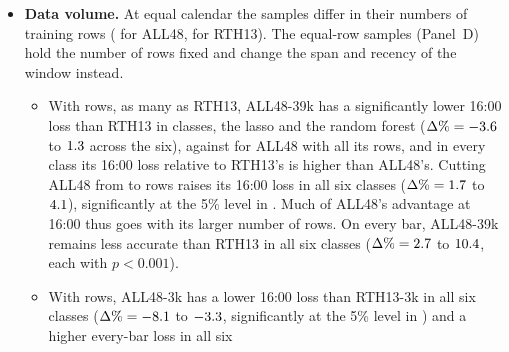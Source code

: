 \begin{itemize}
  \begin{itemize}
  \item The full-set forecasts trained on ALL48 have a higher every-bar QLIKE than those trained on RTH13 in all six
    classes ($\Delta\% = \rhtaAllVsRthBarPctMin$ to $\rhtaAllVsRthBarPctMax$), each significant at the 1\% level
    (the largest, \rhtaAllVsRthBarPMax).
  \item The full predictor set lowers the every-bar loss significantly in every class under both samples, and by more
    under RTH13 in all six: $\Delta\% = \rhtaLinPctRthBarMin$ to $\rhtaLinPctRthBarMax$ for the penalized linear models
    and $\rhtaTreePctRthBarMin$ to $\rhtaTreePctRthBarMax$ for the tree ensembles, against $\rhtaLinPctAllBarMin$ to
    $\rhtaLinPctAllBarMax$ and $\rhtaTreePctAllBarMin$ to $\rhtaTreePctAllBarMax$ under ALL48.
  \end{itemize}
\item \textbf{Data volume.} At equal calendar the samples differ in their numbers of training rows (\rhtaRowsAll{}
  for ALL48, \rhtaRowsRth{} for RTH13). The equal-row samples (Panel~D) hold the number of rows fixed and change the
  span and recency of the window instead.
  \begin{itemize}
  \item With \rhtaRowsLarge{} rows, as many as RTH13, ALL48-39k has a significantly lower 16:00 loss than RTH13 in
    \rhtaNAllThirtyNineKVsRthCloseSig{} classes, the lasso and the random forest
    ($\Delta\% = -3.6$ to $1.3$ across the six),
    against \rhtaNAllVsRthCloseSig{} for ALL48 with all its rows, and in every class its 16:00 loss relative to
    RTH13's is higher than ALL48's. Cutting ALL48 from \rhtaRowsAll{} to \rhtaRowsLarge{} rows raises its 16:00 loss
    in all six classes ($\Delta\% = 1.7$ to $4.1$),
    significantly at the 5\% level in \rhtaNAllThirtyNineKVsAllCloseSig. Much of ALL48's advantage at 16:00 thus
    goes with its larger number of rows. On every bar, ALL48-39k remains less accurate than RTH13 in all six classes
    ($\Delta\% = 2.7$ to $10.4$, each with $p < 0.001$).
  \item With \rhtaRowsSmall{} rows, ALL48-3k has a lower 16:00 loss than RTH13-3k in all six classes
    ($\Delta\% = -8.1$ to $-3.3$, significantly at the
    5\% level in \rhtaNAllThreeKVsRthThreeKCloseSig) and a higher every-bar loss in all six

\end{itemize}
\end{itemize}
